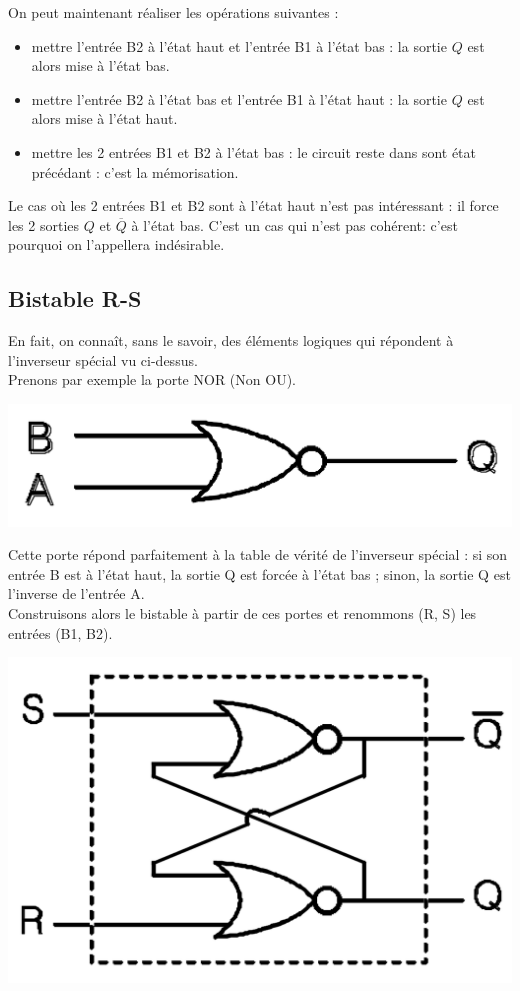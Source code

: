 On peut maintenant réaliser les opérations suivantes :
\vspace{3mm}
\begin{itemize}
\item mettre l'entrée B2 à l'état haut et l'entrée B1 à l'état bas : la sortie $Q$ est alors mise à l'état bas.
\item mettre l'entrée B2 à l'état bas et l'entrée B1 à l'état haut : la sortie $Q$ est alors mise à l'état haut.
\item mettre les 2 entrées B1 et B2 à l'état bas : le circuit reste dans sont état précédant : c'est la
mémorisation.
\end{itemize}
\vspace{3mm}
Le cas où les 2 entrées B1 et B2 sont à l'état haut n'est pas intéressant : il force les 2 sorties $Q$ et $\overline{Q}$ à
l'état bas. C'est un cas qui n'est pas cohérent: c'est pourquoi on l'appellera indésirable.

\subsection{Bistable R-S}
En fait, on connaît, sans le savoir, des éléments logiques qui répondent à l'inverseur spécial vu ci-dessus.\\
Prenons par exemple la porte NOR (Non OU).
\begin{center}
\includegraphics[scale=0.2]{Labo3_NOR.png}
\end{center}

Cette porte répond parfaitement à la table de vérité de l'inverseur spécial : si son entrée B est à l'état haut, la sortie Q est forcée à l'état bas ; sinon, la sortie Q est l'inverse de l'entrée A.\\


Construisons alors le bistable à partir de ces portes et renommons (R, S) les entrées (B1, B2).
\begin{center}
\includegraphics[scale=0.3]{Labo3_RS_NOR.png}
\end{center}

